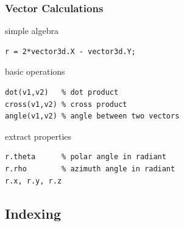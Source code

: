 \documentclass[compress]{beamer}
\begin{document}
\begin{frame}[fragile]
  \frametitle{Vector Calculations}

  simple algebra
\begin{lstlisting}[style=input]
r = 2*vector3d.X - vector3d.Y;
\end{lstlisting}

  \pause \medskip


  basic operations
\begin{lstlisting}[style=input]
dot(v1,v2)   % dot product
cross(v1,v2) % cross product
angle(v1,v2) % angle between two vectors
\end{lstlisting}

  \pause \medskip

  extract properties
\begin{lstlisting}[style=input]
r.theta      % polar angle in radiant
r.rho        % azimuth angle in radiant
r.x, r.y, r.z
\end{lstlisting}

\end{frame}


\subsection*{Indexing}
\end{document}

